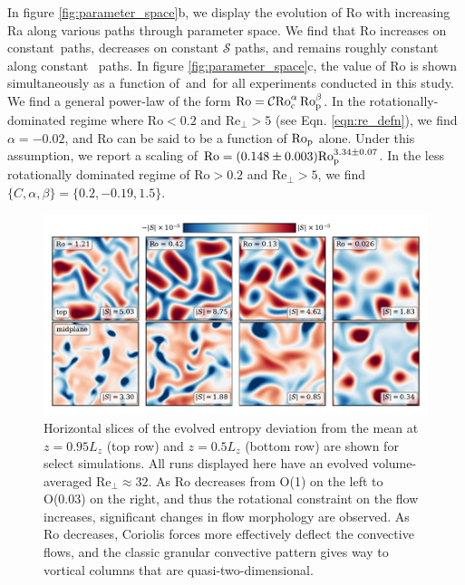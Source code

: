 In figure \ref{fig:parameter_space}b, we display the evolution of Ro
with increasing Ra along various paths through parameter space.
We find that Ro increases on constant \con$\,$paths, decreases on constant $\mathcal{S}$
paths, and remains roughly constant along constant \pro$\,$ paths.
In figure \ref{fig:parameter_space}c, the value of Ro is shown simultaneously as
a function of \pro$\,$and \con$\,$for all experiments conducted in this study.
We find a general power-law of the form \mbox{$\text{Ro} = \mathcal{C} \text{Ro}_{\text{c}}^{\alpha}\,\text{Ro}_{\text{p}}^{\beta}$}.
In the rotationally-dominated regime where $\text{Ro} < 0.2$ and 
$\text{Re}_{\perp} > 5$ (see Eqn. \ref{eqn:re_defn}),
we find $\alpha = -0.02$, and $\text{Ro}$ can be said to be a function
of $\text{Ro}_{\text{p}}$ alone. Under this assumption, we report a scaling of $\text{Ro} = (0.148 \pm 0.003) \text{Ro}_{\text{p}}^{3.34 \pm 0.07}$.
In the less rotationally dominated regime of $\text{Ro} > 0.2$ and $\text{Re}_{\perp} > 5$, 
we find $\{C, \alpha, \beta\} = \{0.2, -0.19, 1.5\}$.




\begin{figure}[ht!]
    \includegraphics[width=\textwidth]{./figs/dynamics_plot.pdf}
    \caption[Depiction of flow morphologies at various values of the Rossby number]
	{ Horizontal slices of the evolved entropy deviation from the mean
	at $z = 0.95L_z$ (top row) and $z = 0.5L_z$ (bottom row) are shown for select simulations. 
	All runs displayed here have an evolved volume-averaged $\text{Re}_\perp \approx 32$. 
    As Ro decreases from O(1) on the left to O(0.03) on the right, and thus the rotational
    constraint on the flow increases, significant changes in flow morphology are observed.
    As Ro decreases, Coriolis forces more effectively
    deflect the convective flows, and the classic granular convective pattern gives way
    to vortical columns that are quasi-two-dimensional.
    \label{fig:dynamics_plot} }
\end{figure}


